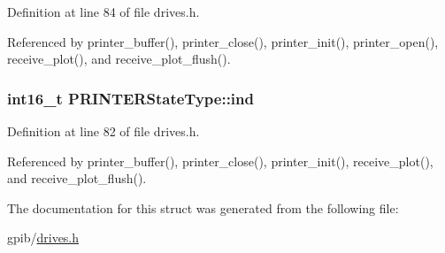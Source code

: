 Definition at line 84 of file drives.\+h.



Referenced by printer\+\_\+buffer(), printer\+\_\+close(), printer\+\_\+init(), printer\+\_\+open(), receive\+\_\+plot(), and receive\+\_\+plot\+\_\+flush().

\subsubsection[{\texorpdfstring{ind}{ind}}]{\setlength{\rightskip}{0pt plus 5cm}int16\+\_\+t P\+R\+I\+N\+T\+E\+R\+State\+Type\+::ind}\hypertarget{structPRINTERStateType_a7d8873d0011f31d7dd00c2b7e0d362bd}{}\label{structPRINTERStateType_a7d8873d0011f31d7dd00c2b7e0d362bd}


Definition at line 82 of file drives.\+h.



Referenced by printer\+\_\+buffer(), printer\+\_\+close(), printer\+\_\+init(), receive\+\_\+plot(), and receive\+\_\+plot\+\_\+flush().



The documentation for this struct was generated from the following file\+:\begin{DoxyCompactItemize}
\item 
gpib/\hyperlink{drives_8h}{drives.\+h}\end{DoxyCompactItemize}
